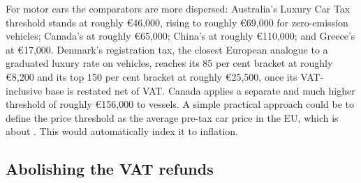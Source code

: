 \documentclass{article}
\begin{document}

For motor cars the comparators are more dispersed: Australia's Luxury Car Tax threshold stands at
roughly \euro{}46{,}000, rising to roughly \euro{}69{,}000 for zero-emission vehicles; Canada's at
roughly \euro{}65{,}000; China's at roughly \euro{}110{,}000; and Greece's at \euro{}17{,}000. %
Denmark's registration tax, the closest European analogue to a graduated luxury rate on vehicles,
reaches its 85 per cent bracket at roughly \euro{}8{,}200 and its top 150 per cent bracket at roughly
\euro{}25{,}500, once its VAT-inclusive base is restated net of VAT. Canada applies a separate and
much higher threshold of roughly \euro{}156{,}000 to vessels. A simple practical approach could be to define the price threshold as the average pre-tax car price in the EU, which is about . This would automatically index it to inflation.


\subsection{Abolishing the VAT refunds}
\end{document}

